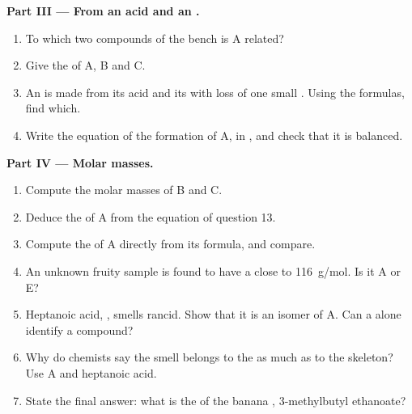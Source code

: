 \begin{problem}
\medskip
\noindent\textbf{Part III --- From an acid and an .}
\begin{enumerate}[resume]
  \item To which two compounds of the bench is A related?
  \item Give the  of A, B and C.
  \item An  is made from its acid and its  with loss of one
        small . Using the formulas, find which.
  \item Write the equation of the formation of A, in ,
        and check that it is balanced.
\end{enumerate}

\medskip
\noindent\textbf{Part IV --- Molar masses.}
\begin{enumerate}[resume]
  \item Compute the molar masses of B and C.
  \item Deduce the  of A from the equation of question 13.
  \item Compute the  of A directly from its formula, and
        compare.
  \item An unknown fruity sample is found to have a  close to
        \qty{116}{g/mol}. Is it A or E?
  \item Heptanoic acid, , smells rancid. Show that it
        is an isomer of A. Can a  alone identify a compound?
  \item Why do chemists say the smell belongs to the  as
        much as to the skeleton? Use A and heptanoic acid.
  \item State the final answer: what is the  of the banana
        , 3-methylbutyl ethanoate?
\end{enumerate}
\end{problem}
